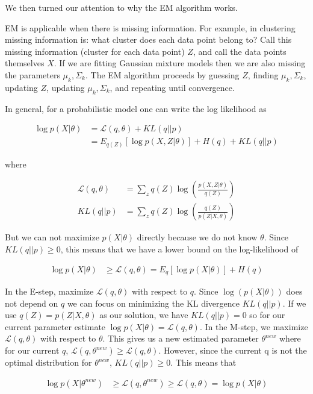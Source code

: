 \documentclass[11pt]{article}
\begin{document}
We then turned our attention to why the EM algorithm works.  

EM is applicable when there is missing information.  For example, in clustering missing information is: what cluster does each data point belong to?  Call this missing information (cluster for each data point) $Z$, and call the data points themselves $X$.  If we are fitting Gaussian mixture models then we are also missing the parameters ${\mu_k}, {\Sigma_k}$.  The EM algorithm proceeds by guessing $Z$, finding $\mu_k, \Sigma_k$, updating $Z$, updating $\mu_k, \Sigma_k$, and repeating until convergence.

In general, for a probabilistic model one can write the log likelihood as

\begin{align}
\log p(X|\theta) &= \mathcal{L}(q,\theta) + KL(q||p) \\
                           &= E_{q(Z)}[\log p(X,Z|\theta)] + H(q) + KL(q||p)
\end{align}

where

\begin{align}
\mathcal{L}(q,\theta) &= \sum_{z}{q(Z)\log(\frac{p(X,Z|\theta)}{q(Z)})} \\
KL(q||p) &= \sum_{z}{q(Z)\log(\frac{q(Z)}{p(Z|X,\theta)})}
\end{align}

But we can not maximize $p(X|\theta)$ directly because we do not know $\theta$.  Since $ KL(q||p) \geq 0$, this means that we have a lower bound on the log-likelihood of

\begin{align}
\log p(X|\theta) &\geq \mathcal{L}(q,\theta) = E_{q}[\log p(X|\theta)] + H(q)
\end{align}

In the E-step, maximize $\mathcal{L}(q,\theta)$ with respect to $q$.  Since $\log(p(X|\theta))$ does not depend on $q$ we can focus on minimizing the KL divergence $KL(q||p)$. If we use $q(Z) = p(Z|X,\theta)$ as our solution, we have $KL(q||p) = 0$ so for our current parameter estimate $\log p(X|\theta) = \mathcal{L}(q,\theta)$. In the M-step, we maximize $\mathcal{L}(q,\theta)$ with respect to $\theta$. This gives us a new estimated parameter $\theta^{new}$ where for our current $q$, $\mathcal{L}(q,\theta^{new}) \geq \mathcal{L}(q,\theta)$.  However, since the current q is not the optimal distribution for $\theta^{new}$, $KL(q||p) \geq 0$. This means that 

\begin{align}
\log p(X|\theta^{new}) &\geq \mathcal{L}(q,\theta^{new}) \geq \mathcal{L}(q,\theta) = \log p(X|\theta)
\end{align}
\end{document}
